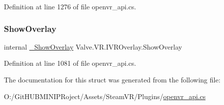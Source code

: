 Definition at line 1276 of file openvr\+\_\+api.\+cs.

\mbox{\label{struct_valve_1_1_v_r_1_1_i_v_r_overlay_a7c23f61f2590e17027d114b269435d70}} 
\subsubsection{\texorpdfstring{ShowOverlay}{ShowOverlay}}
{\footnotesize\ttfamily internal \mbox{\hyperlink{struct_valve_1_1_v_r_1_1_i_v_r_overlay_a4790f23bb779178e96a7b54765d0406f}{\+\_\+\+Show\+Overlay}} Valve.\+V\+R.\+I\+V\+R\+Overlay.\+Show\+Overlay}



Definition at line 1081 of file openvr\+\_\+api.\+cs.



The documentation for this struct was generated from the following file\+:\begin{DoxyCompactItemize}
\item 
O\+:/\+Git\+H\+U\+B\+M\+I\+N\+I\+P\+Roject/\+Assets/\+Steam\+V\+R/\+Plugins/\mbox{\hyperlink{openvr__api_8cs}{openvr\+\_\+api.\+cs}}\end{DoxyCompactItemize}
